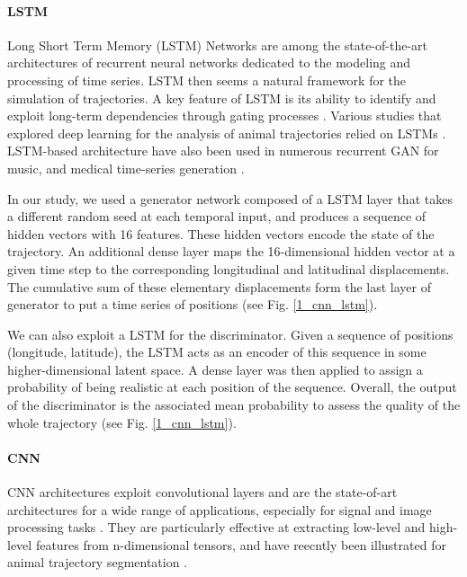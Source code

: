 \documentclass{article}
\begin{document}
\paragraph{LSTM}
Long Short Term Memory (LSTM) Networks are among the state-of-the-art architectures of recurrent neural networks dedicated to the modeling and processing of time series. LSTM then seems a natural framework for the simulation of trajectories. A key feature of LSTM is its ability to identify and exploit  long-term dependencies through gating processes \citep{hochreiter_long_1997}. 
Various studies that explored deep learning for the analysis of animal trajectories relied on LSTMs \citep{wijeyakulasuriya_machine_2020,li_prediction_2021}. LSTM-based architecture have also been used in numerous recurrent GAN for music, and medical time-series generation \citep{mogren_c-rnn-gan_2016,esteban_real-valued_2017}.

In our study, we used a generator network composed of a LSTM layer that takes a different random seed at each temporal input, and produces a sequence of hidden vectors with 16 features. These hidden vectors encode the state of the trajectory. An additional dense layer maps the 16-dimensional hidden vector at a given time step to the corresponding longitudinal and latitudinal displacements. The cumulative sum of these elementary displacements form the last layer of generator to put a time series of positions (see Fig. \ref{1_cnn_lstm}).

We can also exploit a LSTM for the discriminator. Given a sequence of positions (longitude, latitude), the LSTM acts as an encoder of this sequence in some higher-dimensional latent space. A dense layer was then applied to assign a probability of being realistic at each position of the sequence. Overall, the output of the discriminator is the associated mean probability to assess the quality of the whole trajectory (see Fig. \ref{1_cnn_lstm}). 

\paragraph{CNN}
CNN architectures exploit convolutional layers and are the state-of-art architectures for a wide range of applications, especially for signal and image processing tasks \citep{alom_state---art_2019}. They are particularly effective at extracting low-level and high-level features from n-dimensional tensors, and have reecntly been illustrated for animal trajectory segmentation \citep{roy_deep_2021}.
\end{document}
